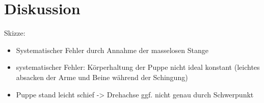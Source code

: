 \section{Diskussion}
\label{sec:Diskussion}


Skizze:
\begin{itemize}
  \item Systematischer Fehler durch Annahme der masselosen Stange
  \item systematischer Fehler: Körperhaltung der Puppe nicht ideal konstant (leichtes
  absacken der Arme und Beine während der Schingung)
  \item Puppe stand leicht schief -> Drehachse ggf. nicht genau durch Schwerpunkt

\end{itemize}
